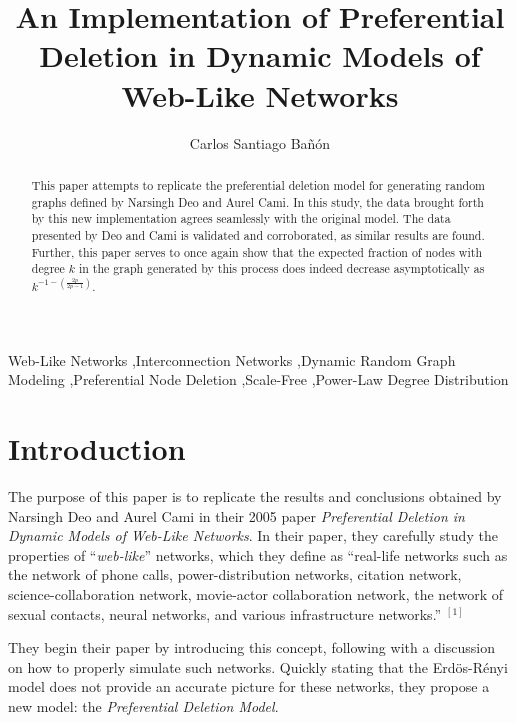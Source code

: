 \documentclass[final,3p,times,twocolumn]{elsarticle}
\begin{document}
\begin{frontmatter}

\title{An Implementation of Preferential Deletion in Dynamic Models of Web-Like Networks}
\author{Carlos Santiago Bañón}
\address{College of Engineering and Computer Science - University of Central Florida - Orlando, FL}

\begin{abstract}
This paper attempts to replicate the preferential deletion model for generating random graphs defined by Narsingh Deo and Aurel Cami. In this study, the data brought forth by this new implementation agrees seamlessly with the original model. The data presented by Deo and Cami is validated and corroborated, as similar results are found. Further, this paper serves to once again show that the expected fraction of nodes with degree $k$ in the graph generated by this process does indeed decrease asymptotically as $k^{-1 - (\frac{2p}{2p - 1})}$.
\end{abstract}

\begin{keyword}
Web-Like Networks \sep Interconnection Networks \sep Dynamic Random Graph Modeling \sep Preferential Node Deletion \sep Scale-Free \sep Power-Law Degree Distribution
\end{keyword}

\end{frontmatter}

\section{Introduction}
\label{S:1}

The purpose of this paper is to replicate the results and conclusions obtained by Narsingh Deo and Aurel Cami in their 2005 paper \textit{Preferential Deletion in Dynamic Models of Web-Like Networks}. In their paper, they carefully study the properties of “\textit{web-like}” networks, which they define as “real-life networks such as the network of phone calls, power-distribution networks, citation network, science-collaboration network, movie-actor collaboration network, the network of sexual contacts, neural networks, and various infrastructure networks.” $^{[1]}$

They begin their paper by introducing this concept, following with a discussion on how to properly simulate such networks. Quickly stating that the Erdös-Rényi model does not provide an accurate picture for these networks, they propose a new model: the \textit{Preferential Deletion Model}.
\end{document}
